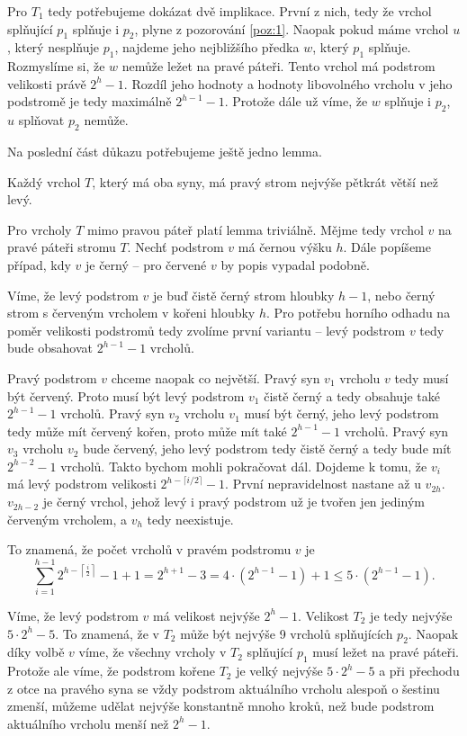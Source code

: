 \begin{dukaz}
Pro $T_1$ tedy potřebujeme dokázat dvě implikace. První z nich, tedy že vrchol
splňující $p_1$ splňuje i $p_2$, plyne z pozorování \ref{poz:1}. Naopak pokud
máme vrchol $u$, který nesplňuje $p_1$, najdeme jeho nejbližšího předka $w$,
který $p_1$ splňuje. Rozmyslíme si, že $w$ nemůže ležet na pravé páteři. Tento vrchol má podstrom velikosti právě $2^{h}-1$. Rozdíl
jeho hodnoty a hodnoty libovolného vrcholu v jeho podstromě je tedy maximálně
$2^{h-1}-1$. Protože dále už víme, že $w$ splňuje i $p_2$, $u$ splňovat $p_2$
nemůže.

Na poslední část důkazu potřebujeme ještě jedno lemma.

\begin{lemma}
Každý vrchol $T$, který má oba syny, má pravý strom nejvýše pětkrát větší než levý.
\end{lemma}
\begin{dukaz}
Pro vrcholy $T$ mimo pravou páteř platí lemma triviálně. Mějme tedy vrchol $v$ na pravé páteři stromu $T$. Nechť podstrom $v$ má černou výšku $h$. Dále popíšeme případ, kdy $v$ je černý -- pro červené $v$ by popis vypadal podobně. 

Víme, že levý podstrom $v$ je buď čistě černý strom hloubky $h-1$, nebo černý strom s červeným vrcholem v kořeni hloubky $h$. Pro potřebu horního odhadu na poměr velikosti podstromů tedy zvolíme první variantu -- levý podstrom $v$ tedy bude obsahovat $2^{h-1} -1$ vrcholů. 

Pravý podstrom $v$ chceme naopak co největší. Pravý syn $v_1$ vrcholu $v$ tedy musí být červený. Proto musí být levý podstrom $v_1$ čistě černý a tedy obsahuje také $2^{h-1} -1$ vrcholů. Pravý syn $v_2$ vrcholu $v_1$ musí být černý, jeho levý podstrom tedy může mít červený kořen, proto může mít také $2^{h-1} -1$ vrcholů. Pravý syn $v_3$ vrcholu $v_2$ bude červený, jeho levý podstrom tedy čistě černý a tedy bude mít $2^{h-2}-1$ vrcholů. Takto bychom mohli pokračovat dál. Dojdeme k tomu, že $v_i$ má levý podstrom velikosti $2^{h-\lceil i/2\rceil} -1$. První nepravidelnost nastane až u $v_{2h}$. $v_{2h-2}$ je černý vrchol, jehož levý i pravý podstrom už je tvořen jen jediným červeným vrcholem, a $v_h$ tedy neexistuje.

To znamená, že počet vrcholů v pravém podstromu $v$ je $$\sum_{i=1}^{h-1}2^{h-\left\lceil \frac i2\right\rceil} -1 +1 = 2^{h+1}-3 = 4\cdot (2^{h-1}-1) +1 \leq 5\cdot(2^{h-1}-1).$$
\end{dukaz}

Víme, že levý podstrom $v$ má velikost nejvýše $2^h-1$. Velikost $T_2$ je tedy nejvýše $5\cdot 2^h - 5$. To znamená, že v $T_2$ může být nejvýše 9 vrcholů splňujících $p_2$. Naopak díky volbě $v$ víme, že všechny vrcholy v $T_2$ splňující $p_1$ musí ležet na pravé páteři. Protože ale víme, že podstrom kořene $T_2$ je velký nejvýše $5\cdot 2^h-5$ a při přechodu z otce na pravého syna se vždy podstrom aktuálního vrcholu alespoň o šestinu zmenší, můžeme udělat nejvýše konstantně mnoho kroků, než bude podstrom aktuálního vrcholu menší než $2^h-1$. 
\end{dukaz}

